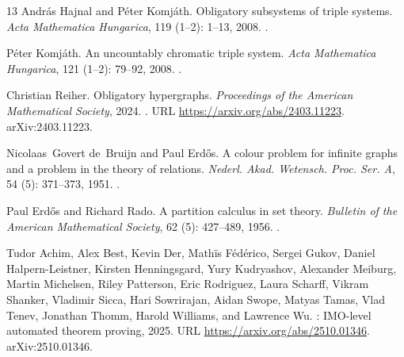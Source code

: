 \documentclass[a4paper,11pt,reqno]{amsart}
\theoremstyle{plain}
\theoremstyle{definition}
\theoremstyle{remark}
\begin{document}
\begin{thebibliography}{13}
Andr{\'a}s Hajnal and P{\'e}ter Komj{\'a}th.
\newblock Obligatory subsystems of triple systems.
\newblock \emph{Acta Mathematica Hungarica}, 119 (1--2):
  1--13, 2008.
\newblock {}.

P{\'e}ter Komj{\'a}th.
\newblock An uncountably chromatic triple system.
\newblock \emph{Acta Mathematica Hungarica}, 121 (1--2):
  79--92, 2008.
\newblock {}.

Christian Reiher.
\newblock Obligatory hypergraphs.
\newblock \emph{Proceedings of the American Mathematical Society}, 2024.
\newblock {}.
\newblock URL \url{https://arxiv.org/abs/2403.11223}.
\newblock arXiv:2403.11223.

Nicolaas~Govert de~Bruijn and Paul Erd{\H{o}}s.
\newblock A colour problem for infinite graphs and a problem in the theory of
  relations.
\newblock \emph{Nederl. Akad. Wetensch. Proc. Ser. A}, 54
  (5): 371--373, 1951.
\newblock {}.

Paul Erd{\H{o}}s and Richard Rado.
\newblock A partition calculus in set theory.
\newblock \emph{Bulletin of the American Mathematical Society}, 62
  (5): 427--489, 1956.
\newblock {}.

Tudor Achim, Alex Best, Kevin Der, Math{\"i}s F{\'e}d{\'e}rico, Sergei Gukov,
  Daniel Halpern-Leistner, Kirsten Henningsgard, Yury Kudryashov, Alexander
  Meiburg, Martin Michelsen, Riley Patterson, Eric Rodriguez, Laura Scharff,
  Vikram Shanker, Vladimir Sicca, Hari Sowrirajan, Aidan Swope, Matyas Tamas,
  Vlad Tenev, Jonathan Thomm, Harold Williams, and Lawrence Wu.
: {IMO}-level automated theorem proving, 2025.
\newblock URL \url{https://arxiv.org/abs/2510.01346}.
\newblock arXiv:2510.01346.

\end{thebibliography}
\end{document}
